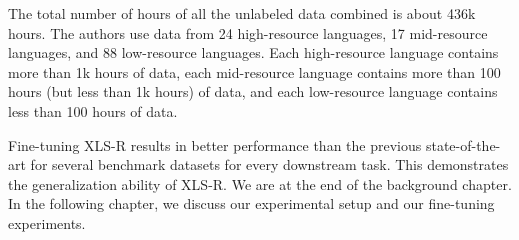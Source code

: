 The total number of hours of all the unlabeled data combined is about 436k hours. The authors use data from 24 high-resource languages, 17 mid-resource languages, and 88 low-resource languages.
Each high-resource language contains more than 1k hours of data, 
each mid-resource language contains more than 100 hours (but less than 1k hours) of data, 
and each low-resource language contains less than 100 hours of data.

Fine-tuning XLS-R results in better performance than the previous state-of-the-art for several benchmark datasets for every downstream task.
This demonstrates the generalization ability of XLS-R. We are at the end of the background chapter. In the following chapter, we discuss our experimental setup and our fine-tuning experiments.